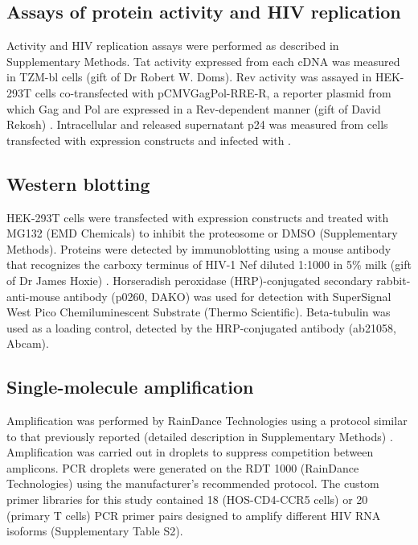 \documentclass[../sherrill-Mix_thesis.tex]{subfiles}
\begin{document}
\subsection{Assays of protein activity and HIV replication}
Activity and HIV replication assays were performed as described in Supplementary Methods. Tat activity expressed from each cDNA was measured in TZM-bl cells \citep{Wei2003} (gift of Dr Robert W. Doms). Rev activity was assayed in HEK-293T cells co-transfected with pCMVGagPol-RRE-R, a reporter plasmid from which Gag and Pol are expressed in a Rev-dependent manner (gift of David Rekosh) \citep{Srinivasakumar1997}. Intracellular and released supernatant p24 was measured from cells transfected with expression constructs and infected with \hivEight{}.

\subsection{Western blotting}
HEK-293T cells were transfected with expression constructs and treated with MG132 (EMD Chemicals) to inhibit the proteosome or DMSO (Supplementary Methods). Proteins were detected by immunoblotting using a mouse antibody that recognizes the carboxy terminus of HIV-1 Nef diluted 1:1000 in 5\% milk (gift of Dr James Hoxie) \citep{Shugars1993}. Horseradish peroxidase (HRP)-conjugated secondary rabbit-anti-mouse antibody (p0260, DAKO) was used for detection with SuperSignal West Pico Chemiluminescent Substrate (Thermo Scientific). Beta-tubulin was used as a loading control, detected by the HRP-conjugated antibody (ab21058, Abcam). 

\subsection{Single-molecule amplification}
Amplification was performed by RainDance Technologies using a protocol similar to that previously reported (detailed description in Supplementary Methods) \citep{Tewhey2009}. Amplification was carried out in droplets to suppress competition between amplicons. PCR droplets were generated on the RDT 1000 (RainDance Technologies) using the manufacturer's recommended protocol. The custom primer libraries for this study contained 18 (HOS-CD4-CCR5 cells) or 20 (primary T cells) PCR primer pairs designed to amplify different HIV RNA isoforms (Supplementary Table S2). 
\end{document}
